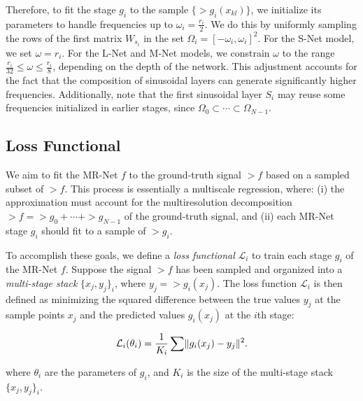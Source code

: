 Therefore, to fit the stage $g_i$ to the sample $\{\gt{g}_i(x_{kl})\}$, we initialize its parameters to handle frequencies up to $\omega_i = \frac{r_i}{2}$. We do this by uniformly sampling the rows of the first matrix $W_{s_i}$ in the set $\Omega_i = \left[-\omega_i, \omega_i\right]^2$. For the S-Net model, we set $\omega = r_i$. For the L-Net and M-Net models, we constrain $\omega$ to the range $\frac{r_i}{32} \leq \omega \leq \frac{r_i}{8}$, depending on the depth of the network. This adjustment accounts for the fact that the composition of sinusoidal layers can generate significantly higher frequencies. Additionally, note that the first sinusoidal layer $S_i$ may reuse some frequencies initialized in earlier stages, since $\Omega_0 \subset \cdots \subset \Omega_{N-1}$.


\subsection{Loss Functional}

We aim to fit the MR-Net $f$ to the ground-truth signal $\gt{f}$ based on a sampled subset of $\gt{f}$. This process is essentially a multiscale regression, where: (i) the approximation must account for the multiresolution decomposition $\gt{f} = \gt{g}_0 + \cdots + \gt{g}_{N-1}$ of the ground-truth signal, and (ii) each MR-Net stage $g_i$ should fit to a sample of $\gt{g}_i$.

To accomplish these goals, we define a \textit{loss functional} $\mathcal{L}_i$ to train each stage $g_i$ of the MR-Net $f$. Suppose the signal $\gt{f}$ has been sampled and organized into a \textit{multi-stage stack} $\{x_j, y_j\}_i$, where $y_j = \gt{g}_i(x_j)$. The loss function $\mathcal{L}_i$ is then defined as minimizing the squared difference between the true values $y_j$ at the sample points $x_j$ and the predicted values $g_i(x_j)$ at the $i$th stage:

\begin{align}\label{e-loss}
    \mathcal{L}_i(\theta_i)=\frac{1}{K_i}\sum \lVert g_i(x_j)-y_j\rVert^2.
\end{align}

where $\theta_i$ are the parameters of $g_i$, and $K_i$ is the size of the multi-stage stack $\{x_j, y_j\}_i$.


